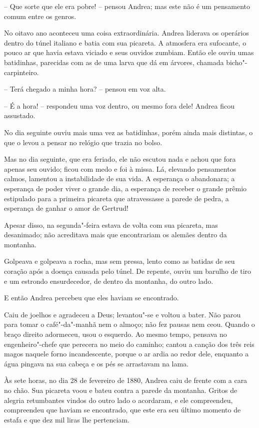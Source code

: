 -- Que sorte que ele era pobre! -- pensou Andrea; mas este não é um
pensamento comum entre os genros.

No oitavo ano aconteceu uma coisa extraordinária. Andrea liderava os
operários dentro do túnel italiano e batia com sua picareta. A
atmosfera era sufocante, o pouco ar que havia estava viciado e seus
ouvidos zumbiam. Então ele ouviu umas batidinhas, parecidas com as de
uma larva que dá em árvores, chamada bicho"-carpinteiro.

-- Terá chegado a minha hora? -- pensou em voz alta.

-- É a hora! -- respondeu uma voz dentro, ou mesmo fora dele! Andrea ficou
assustado.

No dia seguinte ouviu mais uma vez as batidinhas, porém ainda mais
distintas, o que o levou a pensar no relógio que trazia no bolso.

Mas no dia seguinte, que era feriado, ele não escutou nada e achou que
fora apenas seu ouvido; ficou com medo e foi à missa. Lá, elevando
pensamentos calmos, lamentou a instabilidade de sua vida. A esperança o
abandonara; a esperança de poder viver o grande dia, a esperança de
receber o grande prêmio estipulado para a primeira picareta que
atravessasse a parede de pedra, a esperança de ganhar o amor de
Gertrud!

Apesar disso, na segunda"-feira estava de volta com sua picareta, mas
desanimado; não acreditava mais que encontrariam os alemães dentro da
montanha.

Golpeava e golpeava a rocha, mas sem pressa, lento como as batidas de
seu coração após a doença causada pelo túnel. De repente, ouviu um
barulho de tiro e um estrondo ensurdecedor, de dentro da montanha, do
outro lado.

E então Andrea percebeu que eles haviam se encontrado.

Caiu de joelhos e agradeceu a Deus; levantou"-se e voltou a bater. Não
parou para tomar o café"-da"-manhã nem o almoço; não fez pausas nem
ceou. Quando o braço direito adormeceu, usou o esquerdo. Ao mesmo
tempo, pensava no engenheiro"-chefe que perecera no meio do caminho;
cantou a canção dos três reis magos naquele forno incandescente, porque
o ar ardia ao redor dele, enquanto a água pingava na sua cabeça e os
pés se arrastavam na lama.

Às sete horas, no dia 28 de fevereiro de 1880, Andrea caiu de frente com
a cara no chão. Sua picareta voou e bateu contra a parede da montanha.
Gritos de alegria retumbantes vindos do outro lado o acordaram, e ele
compreendeu, compreendeu que haviam se encontrado, que este era seu
último momento de estafa e que dez mil liras lhe pertenciam.

